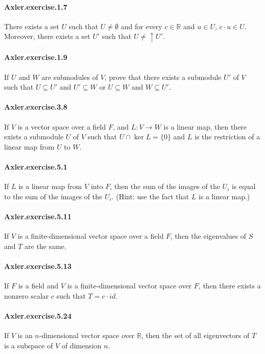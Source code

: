 \documentclass{article}
\begin{document}
\paragraph{Axler.exercise.1.7} There exists a set $U$ such that $U \neq \emptyset$ and for every $c \in \mathbb{R}$ and $u \in U$, $c \cdot u \in U$. Moreover, there exists a set $U'$ such that $U \neq \uparrow U'$.

\paragraph{Axler.exercise.1.9} If $U$ and $W$ are submodules of $V$, prove that there exists a submodule $U'$ of $V$ such that $U \subseteq U'$ and $U' \subseteq W$ or $U \subseteq W$ and $W \subseteq U'$.

\paragraph{Axler.exercise.3.8} If $V$ is a vector space over a field $F$, and $L: V \to W$ is a linear map, then there exists a submodule $U$ of $V$ such that $U \cap \ker L = \{0\}$ and $L$ is the restriction of a linear map from $U$ to $W$.

\paragraph{Axler.exercise.5.1} If $L$ is a linear map from $V$ into $F$, then the sum of the images of the $U_i$ is equal to the sum of the images of the $U_i$. (Hint: use the fact that $L$ is a linear map.)

\paragraph{Axler.exercise.5.11} If $V$ is a finite-dimensional vector space over a field $F$, then the eigenvalues of $S$ and $T$ are the same.

\paragraph{Axler.exercise.5.13} If $F$ is a field and $V$ is a finite-dimensional vector space over $F$, then there exists a nonzero scalar $c$ such that $T = c \cdot id$.

\paragraph{Axler.exercise.5.24} If $V$ is an $n$-dimensional vector space over $\mathbb{R}$, then the set of all eigenvectors of $T$ is a subspace of $V$ of dimension $n$.
\end{document}
